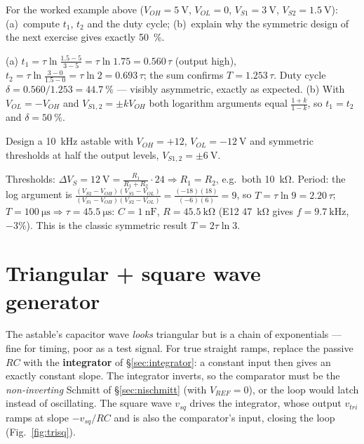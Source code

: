 \documentclass[11pt,a4paper,oneside]{book}
\begin{document}
\begin{exercise}
For the worked example above ($V_{OH}=\qty{5}{\volt}$, $V_{OL}=0$,
$V_{S1}=\qty{3}{\volt}$, $V_{S2}=\qty{1.5}{\volt}$): (a)~compute $t_1$, $t_2$
and the duty cycle; (b)~explain why the symmetric design of the next exercise
gives exactly \qty{50}{\percent}.
\end{exercise}
\begin{solution}
(a) $t_1=\tau\ln\frac{1.5-5}{3-5}=\tau\ln1.75=0.560\,\tau$ (output high),
$t_2=\tau\ln\frac{3-0}{1.5-0}=\tau\ln2=0.693\,\tau$; the sum confirms
$T=1.253\,\tau$. Duty cycle $\delta=0.560/1.253=\qty{44.7}{\percent}$ ---
visibly asymmetric, exactly as expected.
(b) With $V_{OL}=-V_{OH}$ and $V_{S1,2}=\pm kV_{OH}$ both logarithm arguments
equal $\frac{1+k}{1-k}$, so $t_1=t_2$ and $\delta=\qty{50}{\percent}$.
\end{solution}

\begin{exercise}
Design a \qty{10}{\kilo\hertz} astable with $V_{OH}=+12$,
$V_{OL}=\qty{-12}{\volt}$ and symmetric thresholds at half the output levels,
$V_{S1,2}=\pm\qty{6}{\volt}$.
\end{exercise}
\begin{solution}
Thresholds: $\Delta V_S=\qty{12}{\volt}=\frac{R_1}{R_1+R_2}\cdot24\Rightarrow
R_1=R_2$, e.g.\ both \qty{10}{\kilo\ohm}. Period: the log argument is
$\frac{(V_{S2}-V_{OH})(V_{S1}-V_{OL})}{(V_{S1}-V_{OH})(V_{S2}-V_{OL})}
=\frac{(-18)(18)}{(-6)(6)}=9$, so $T=\tau\ln9=2.20\,\tau$;
$T=\qty{100}{\micro\second}\Rightarrow\tau=\qty{45.5}{\micro\second}$:
$C=\qty{1}{\nano\farad}$, $R=\qty{45.5}{\kilo\ohm}$ (E12 \qty{47}{\kilo\ohm}
gives $f=\qty{9.7}{\kilo\hertz}$, $-3\%$). This is the classic symmetric result
$T=2\tau\ln3$.
\end{solution}

\section{Triangular + square wave generator}\label{sec:trisq}
The astable's capacitor wave \emph{looks} triangular but is a chain of
exponentials --- fine for timing, poor as a test signal. For true straight
ramps, replace the passive $RC$ with the \textbf{integrator} of
\S\ref{sec:integrator}: a constant input then gives an exactly constant slope.
The integrator inverts, so the comparator must be the \emph{non-inverting}
Schmitt of \S\ref{sec:nischmitt} (with $V_{REF}=0$), or the loop would latch
instead of oscillating. The square wave $v_{sq}$ drives the integrator, whose
output $v_{tri}$ ramps at slope $-v_{sq}/RC$ and is also the comparator's
input, closing the loop (Fig.~\ref{fig:trisq}).
\end{document}
